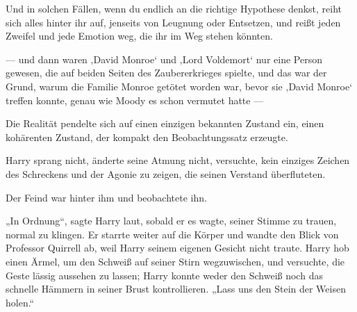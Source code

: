 Und in solchen Fällen, wenn du endlich an die richtige Hypothese denkst, reiht sich alles hinter ihr auf, jenseits von Leugnung oder Entsetzen, und reißt jeden Zweifel und jede Emotion weg, die ihr im Weg stehen könnten.

— und dann waren ‚David Monroe‘ und ‚Lord Voldemort‘ nur eine Person gewesen, die auf beiden Seiten des Zaubererkrieges spielte, und das war der Grund, warum die Familie Monroe getötet worden war, bevor sie ‚David Monroe‘ treffen konnte, genau wie Moody es schon vermutet hatte —

Die Realität pendelte sich auf einen einzigen bekannten Zustand ein, einen kohärenten Zustand, der kompakt den Beobachtungssatz erzeugte.

Harry sprang nicht, änderte seine Atmung nicht, versuchte, kein einziges Zeichen des Schreckens und der Agonie zu zeigen, die seinen Verstand überfluteten.

Der Feind war hinter ihm und beobachtete ihn.

„In Ordnung“, sagte Harry laut, sobald er es wagte, seiner Stimme zu trauen, normal zu klingen. Er starrte weiter auf die Körper und wandte den Blick von Professor Quirrell ab, weil Harry seinem eigenen Gesicht nicht traute. Harry hob einen Ärmel, um den Schweiß auf seiner Stirn wegzuwischen, und versuchte, die Geste lässig aussehen zu lassen; Harry konnte weder den Schweiß noch das schnelle Hämmern in seiner Brust kontrollieren.
„Lass uns den Stein der Weisen holen.“

